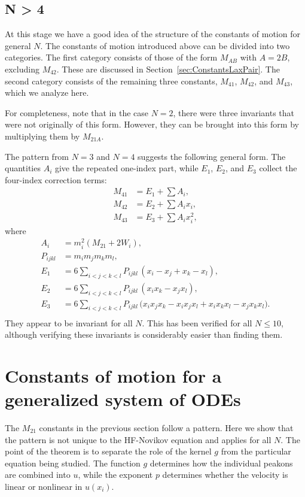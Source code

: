 \documentclass[english,master]{liumaiex}
\theoremstyle{thesisplain}
\theoremstyle{thesisdefinition}
\numberwithin{equation}{section}
\begin{document}
\subsection*{N > 4}
At this stage we have a good idea of the structure of the constants of motion for general $N$.
The constants of motion introduced above can be divided into two categories.
The first category consists of those of the form $M_{AB}$ with $A=2B$, excluding $M_{42}$. These are discussed in Section~\ref{sec:ConstantsLaxPair}.
The second category consists of the remaining three constants, $M_{41}$, $M_{42}$, and $M_{43}$, which we analyze here.

For completeness, note that in the case $N=2$, there were three invariants that were not originally of this form. However, they can be brought into this form by multiplying them by $M_{21A}$.

The pattern from $N=3$ and $N=4$ suggests the following general form. The quantities $A_i$ give the repeated one-index part, while $E_1$, $E_2$, and $E_3$ collect the four-index correction terms:
\begin{align}
	M_{41} &= E_1 + \sum A_i, \\
	M_{42} &= E_2 + \sum A_i x_i, \\
	M_{43} &= E_3 + \sum A_i x_i^2,
\end{align}
where
\begin{align}
	A_i &= m_i^2(M_{21} + 2W_i), \\
	P_{ijkl} &= m_i m_j m_k m_l, \\
	E_1 &= 6 \sum_{i < j < k < l} P_{ijkl}\,(x_i - x_j + x_k - x_l), \\
	E_2 &= 6 \sum_{i < j < k < l} P_{ijkl}\,(x_i x_k - x_j x_l), \\
	E_3 &= 6 \sum_{i < j < k < l} P_{ijkl}\, \bigl( x_i x_j x_k - x_i x_j x_l + x_i x_k x_l - x_j x_k x_l \bigr). \\
\end{align}
They appear to be invariant for all $N$. This has been verified for all $N \le 10$, although verifying these invariants is considerably easier than finding them.

\section{Constants of motion for a generalized system of ODEs}
The $M_{21}$ constants in the previous section follow a pattern. Here we show that the pattern is not unique to the HF-Novikov equation and applies for all $N$. The point of the theorem is to separate the role of the kernel $g$ from the particular equation being studied. The function $g$ determines how the individual peakons are combined into $u$, while the exponent $p$ determines whether the velocity is linear or nonlinear in $u(x_i)$.
\end{document}
